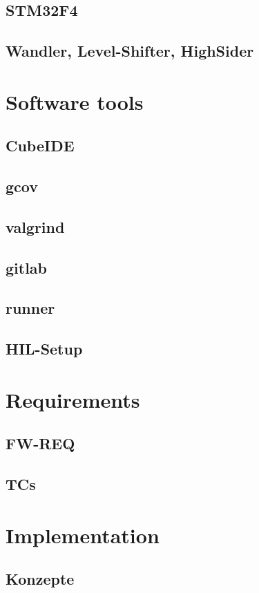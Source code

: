 	\section{STM32F4}
	\section{Wandler, Level-Shifter, HighSider}

\chapter{Software tools}
\label{cha:SoftwareTools}
	\section{CubeIDE}
	\section{gcov}
	\section{valgrind}
	\section{gitlab}
	\section{runner}
	\section{HIL-Setup}
	
\chapter{Requirements}
\label{cha:Requirements}
	\section{FW-REQ}
	\section{TCs}
	
\chapter{Implementation}
\label{cha:Implementation}
	\section{Konzepte}
